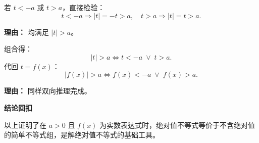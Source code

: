 \begin{proofbox}
\begin{description}[style=nextline, leftmargin=2.8em, labelsep=0.5em, itemsep=0.55em]
	\item[\textbf{步骤七（大于情形反向）：}] 若 $t<-a$ 或 $t>a$，直接检验：
		\[
			t<-a\Rightarrow |t|=-t>a,\quad t>a\Rightarrow |t|=t>a.
		\]
		\par\textbf{理由：} 均满足 $|t|>a$。

	\item[\textbf{步骤八（大于结论）：}] 组合得：
		\[
			|t|>a \iff t<-a \;\lor\; t>a.
		\]
		代回 $t=f(x)$：
		\[
			|f(x)|>a \iff f(x)<-a \;\lor\; f(x)>a.
		\]
		\par\textbf{理由：} 同样双向推理完成。
\end{description}

\medskip
\textbf{\textcolor{CProof}{结论回扣}}

以上证明了在 $a>0$ 且 $f(x)$ 为实数表达式时，绝对值不等式等价于不含绝对值的简单不等式组，是解绝对值不等式的基础工具。
\end{proofbox}
